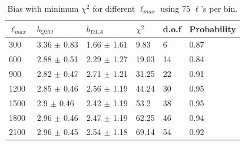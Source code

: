 \documentclass{amsart}
\begin{document}
\begin{table}[htbp]
\caption{Bias with minimum $\chi^2$  for different $\ell_{max}$ using 75 $\ell$'s per bin.}
\centering
\begin{tabular}{p{}p{}p{}p{}p{}p{}} \\ \toprule
$\ell_{max}$ & \multicolumn{1}{p{0cm}}{$b_{QSO}$} & $b_{DLA}$ & \multicolumn{1}{p{2cm}}{$\chi^2$} & d.o.f  & Probability\\ \midrule
300  &  3.36  $\pm$  0.83  &  1.66  $\pm$  1.61  &  9.83  &  6  &  0.87 \\
600  &  2.88  $\pm$  0.51  &  2.29  $\pm$  1.27  &  19.03  &  14  &  0.84 \\
900  &  2.82  $\pm$  0.47  &  2.71  $\pm$  1.21  &  31.25  &  22  &  0.91 \\
1200  &  2.85  $\pm$  0.46  &  2.56  $\pm$  1.19  &  44.24  &  30  &  0.95 \\
1500  &  2.9  $\pm$  0.46  &  2.42  $\pm$  1.19  &  53.2  &  38  &  0.95 \\
1800  &  2.96  $\pm$  0.46  &  2.47  $\pm$  1.19  &  62.25  &  46  &  0.94 \\
2100  &  2.96  $\pm$  0.45  &  2.54  $\pm$  1.18  &  69.14  &  54  &  0.92 \\ \bottomrule
\end{tabular}
\end{table}
\end{document}
